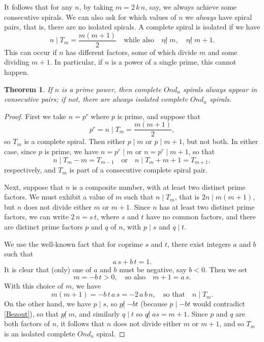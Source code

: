 \documentclass{article}
\newtheorem{theorem}{Theorem}
\theoremstyle{definition}
\def\com#1{\quad\text{{#1}}\quad}
\def\ndiv{{\not|\;}}
\begin{document}
It follows that for any $n$, by taking $m=2\,k\,n$, say, we always
achieve some consecutive spirals.  We can also ask for which values of
$n$ we \emph{always} have spiral pairs, that is, there are no isolated
spirals.  A complete spiral is isolated if we have
\[
  n \mid T_m=\frac{m(m+1)}2 \com{while also}
  n \ndiv m, \quad  n \ndiv m+1.
\]
This can occur if $n$ has different factors, some of which divide $m$
and some dividing $m+1$.  In particular, if $n$ is a power of a single
prime, this cannot happen.

\begin{theorem}
\label{thm:tri}
If $n$ is a prime power, then complete $Ond_n$ spirals
always appear in consecutive pairs; if not, there are always isolated
complete $Ond_n$ spirals.
\end{theorem}

\begin{proof}
First we take $n=p^r$ where $p$ is prime, and suppose that
\[
  p^r = n\mid T_m=\frac{m(m+1)}2,
\]
so $T_m$ is a complete spiral.  Then either $p\mid m$ or $p\mid m+1$, but not
both.  In either case, since $p$ is prime, we have $n=p^r\mid m$ or
$n=p^r\mid m+1$, so that
\[
  n\mid T_m - m = T_{m-1}  \com{or}
  n\mid T_m + m+1 = T_{m+1},
\]
respectively, and $T_m$ is part of a consecutive complete spiral pair.

Next, suppose that $n$ is a composite number, with at least two
distinct prime factors.  We must exhibit a value of $m$ such that
$n\mid T_m$, that is $2n\mid m(m+1)$, but $n$ does not divide either $m$ or
$m+1$.  Since $n$ has at least two distinct prime factors, we can
write $2\,n = s\,t$, where $s$ and $t$ have no common factors, and
there are distinct prime factors $p$ and $q$ of $n$, with $p\mid s$ and
$q\mid t$.

We use the well-known fact \cite{Davenport} that for coprime $s$
and $t$, there exist integers $a$ and $b$ such that
\begin{equation}
  a\,s + b\,t = 1.
\label{Bezout}
\end{equation}
It is clear that (only) one of $a$ and $b$ must be negative, say
$b<0$.  Then we set
\[
  m = -b\,t>0, \com{so also}
  m+1 = a\,s.
\]
With this choice of $m$, we have
\[
  m(m+1) = -b\,t\,a\,s = -2\,a\,b\,n, \com{so that}
  n\mid T_m.
\]
On the other hand, we have $p\mid s$, so $p \ndiv {-bt}$ (because $p\mid {-bt}$
would contradict \eqref{Bezout}), so that $p \ndiv m$, and similarly
$q\mid t$ so $q \ndiv as=m+1$.  Since $p$ and $q$ are both factors of
$n$, it follows that $n$ does not divide either $m$ or $m+1$, and so
$T_m$ is an isolated complete $Ond_n$ spiral.
\end{proof}
\end{document}
